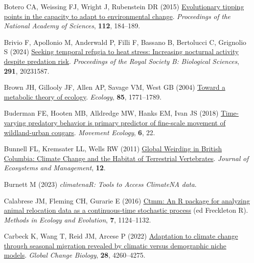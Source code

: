 \documentclass[
  12pt,
]{article}
\newlength{\cslhangindent}
\newenvironment{CSLReferences}[2] %
 {\begin{list}{}{%
  \setlength{\itemindent}{0pt}
  \setlength{\leftmargin}{0pt}
  \setlength{\parsep}{0pt}
  \ifodd #1
   \setlength{\leftmargin}{\cslhangindent}
   \setlength{\itemindent}{-1\cslhangindent}
  \fi
  \setlength{\itemsep}{#2\baselineskip}}}
 {\end{list}}
\begin{document}
\begin{CSLReferences}{1}{0}
Botero CA, Weissing FJ, Wright J, Rubenstein DR (2015) \href{https://doi.org/10.1073/pnas.1408589111}{Evolutionary tipping points in the capacity to adapt to environmental change}. \emph{Proceedings of the National Academy of Sciences}, \textbf{112}, 184--189.

Brivio F, Apollonio M, Anderwald P, Filli F, Bassano B, Bertolucci C, Grignolio S (2024) \href{https://doi.org/10.1098/rspb.2023.1587}{Seeking temporal refugia to heat stress: Increasing nocturnal activity despite predation risk}. \emph{Proceedings of the Royal Society B: Biological Sciences}, \textbf{291}, 20231587.

Brown JH, Gillooly JF, Allen AP, Savage VM, West GB (2004) \href{https://doi.org/10.1890/03-9000}{Toward a metabolic theory of ecology}. \emph{Ecology}, \textbf{85}, 1771--1789.

Buderman FE, Hooten MB, Alldredge MW, Hanks EM, Ivan JS (2018) \href{https://doi.org/10.1186/s40462-018-0140-6}{Time-varying predatory behavior is primary predictor of fine-scale movement of wildland-urban cougars}. \emph{Movement Ecology}, \textbf{6}, 22.

Bunnell FL, Kremsater LL, Wells RW (2011) \href{https://doi.org/10.22230/jem.2011v12n2a74}{Global {Weirding} in {British} {Columbia}: {Climate} {Change} and the {Habitat} of {Terrestrial} {Vertebrates}}. \emph{Journal of Ecosystems and Management}, \textbf{12}.

Burnett M (2023) \emph{\emph{{climatenaR}: {Tools} to {Access} {ClimateNA} data}}.

Calabrese JM, Fleming CH, Gurarie E (2016) \href{https://doi.org/10.1111/2041-210X.12559}{Ctmm: An {R} package for analyzing animal relocation data as a continuous‐time stochastic process} (ed Freckleton R). \emph{Methods in Ecology and Evolution}, \textbf{7}, 1124--1132.

Carbeck K, Wang T, Reid JM, Arcese P (2022) \href{https://doi.org/10.1111/gcb.16185}{Adaptation to climate change through seasonal migration revealed by climatic versus demographic niche models}. \emph{Global Change Biology}, \textbf{28}, 4260--4275.


\end{CSLReferences}
\end{document}

